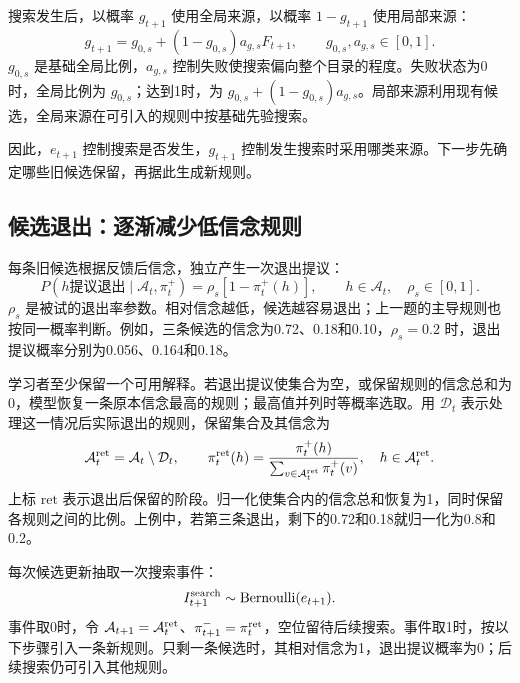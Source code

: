 \documentclass[12pt]{article}
\begin{document}
搜索发生后，以概率 $g_{t+1}$ 使用全局来源，以概率 $1-g_{t+1}$ 使用局部来源：
\begin{equation}
g_{t+1}=g_{0,s}+(1-g_{0,s})a_{g,s}F_{t+1},
\qquad g_{0,s},a_{g,s}\in[0,1].
\label{eq:global-range}
\end{equation}
$g_{0,s}$ 是基础全局比例，$a_{g,s}$ 控制失败使搜索偏向整个目录的程度。失败状态为0时，全局比例为 $g_{0,s}$；达到1时，为 $g_{0,s}+(1-g_{0,s})a_{g,s}$。局部来源利用现有候选，全局来源在可引入的规则中按基础先验搜索。

因此，$e_{t+1}$ 控制搜索是否发生，$g_{t+1}$ 控制发生搜索时采用哪类来源。下一步先确定哪些旧候选保留，再据此生成新规则。

\subsection{候选退出：逐渐减少低信念规则}
\label{sec:management}

每条旧候选根据反馈后信念，独立产生一次退出提议：
\begin{equation}
P(h\text{提议退出}\mid\mathcal A_t,\pi_t^+)
=\rho_s[1-\pi_t^+(h)],\qquad h\in\mathcal A_t,\quad\rho_s\in[0,1].
\label{eq:exit}
\end{equation}
$\rho_s$ 是被试的退出率参数。相对信念越低，候选越容易退出；上一题的主导规则也按同一概率判断。例如，三条候选的信念为0.72、0.18和0.10，$\rho_s=0.2$ 时，退出提议概率分别为0.056、0.164和0.18。

学习者至少保留一个可用解释。若退出提议使集合为空，或保留规则的信念总和为0，模型恢复一条原本信念最高的规则；最高值并列时等概率选取。用 $\mathcal D_t$ 表示处理这一情况后实际退出的规则，保留集合及其信念为
\begin{equation}
\mathcal A_t^{\rm ret}=\mathcal A_t\setminus\mathcal D_t,\qquad
\pi_t^{\rm ret}(h)=\frac{\pi_t^+(h)}{\sum_{v\in\mathcal A_t^{\rm ret}}\pi_t^+(v)},
\quad h\in\mathcal A_t^{\rm ret}.
\label{eq:remaining-belief}
\end{equation}
上标 $\mathrm{ret}$ 表示退出后保留的阶段。归一化使集合内的信念总和恢复为1，同时保留各规则之间的比例。上例中，若第三条退出，剩下的0.72和0.18就归一化为0.8和0.2。

每次候选更新抽取一次搜索事件：
\begin{equation}
I_{t+1}^{\rm search}\sim\operatorname{Bernoulli}(e_{t+1}).
\end{equation}
事件取0时，令 $\mathcal A_{t+1}=\mathcal A_t^{\rm ret}$、$\pi_{t+1}^-=\pi_t^{\rm ret}$，空位留待后续搜索。事件取1时，按以下步骤引入一条新规则。只剩一条候选时，其相对信念为1，退出提议概率为0；后续搜索仍可引入其他规则。
\end{document}
